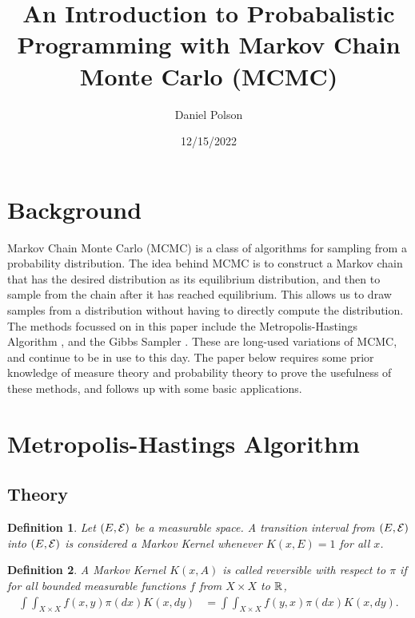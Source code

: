\documentclass[10pt]{article}
\title{An Introduction to Probabalistic Programming with Markov Chain Monte Carlo (MCMC)} %
\author{Daniel Polson} %
\date{12/15/2022} %
\newtheorem{definition}{Definition}
\begin{document}

\maketitle


\section{Background}

Markov Chain Monte Carlo (MCMC) is a class of algorithms for sampling from a probability distribution. The idea behind MCMC is to construct a Markov chain that has the desired distribution as its equilibrium distribution, and then to sample from the chain after it has reached equilibrium. This allows us to draw samples from a distribution without having to directly compute the distribution. The methods focussed on in this paper include the Metropolis-Hastings Algorithm \cite{hast}, and the Gibbs Sampler \cite{gibbs}. These are long-used variations of MCMC, and continue to be in use to this day. The paper below requires some prior knowledge of measure theory and probability theory to prove the usefulness of these methods, and follows up with some basic applications.


\section{Metropolis-Hastings Algorithm}


\subsection{Theory}

\begin{definition}
    Let $\left( E, \mathcal{E} \right)$ be a measurable space. A transition interval from $\left( E, \mathcal{E} \right)$ into $\left( E, \mathcal{E} \right)$ is considered a Markov Kernel whenever $K \left( x, E \right) = 1$ for all $x$.
\end{definition}



\begin{definition}
    A Markov Kernel $K \left( x, A \right)$ is called reversible with respect to $\pi$ if for all bounded measurable functions $f$ from $X \times X$ to $\mathbb{R}$, 
    \begin{align*}
        \int \int _{X \times X} f \left( x, y \right) \pi \left( dx \right) K \left( x, dy \right) &= \int \int _{X \times X} f \left( y, x \right) \pi \left( dx \right) K \left( x, dy \right).
    \end{align*}
\end{definition}
\end{document}
